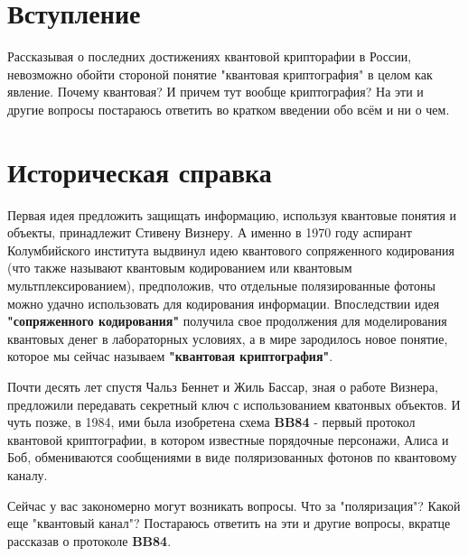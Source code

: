 





\section{Вступление}

Рассказывая о последних достижениях квантовой крипторафии в России, невозможно обойти стороной понятие "квантовая криптография" в целом как явление.
Почему квантовая? И причем тут вообще криптография? На эти и другие вопросы постараюсь ответить во кратком введении обо всём и ни о чем.

\section{Историческая справка}

Первая идея предложить защищать информацию, используя квантовые понятия и объекты, принадлежит Стивену Визнеру. 
А именно в 1970 году аспирант Колумбийского института выдвинул идею квантового сопряженного кодирования (что также называют квантовым кодированием или квантовым мультплексированием), 
предположив, что отдельные полязированные фотоны можно удачно использовать для кодирования информации. Впоследствии идея \textbf{"сопряженного кодирования"} получила свое продолжения для моделирования квантовых денег в лабораторных условиях, а в мире зародилось новое понятие, которое мы сейчас называем \textbf{"квантовая криптография"}. 

Почти десять лет спустя Чальз Беннет и Жиль Бассар, зная о работе Визнера, предложили передавать секретный ключ с использованием кватонвых объектов. И чуть позже, в 1984, ими была изобретена схема \textbf{BB84} - первый протокол квантовой криптографии, в котором известные порядочные персонажи, Алиса и Боб, обмениваются сообщениями в виде поляризованных фотонов по квантовому каналу. 

Сейчас у вас закономерно могут возникать вопросы. Что за "поляризация"? Какой еще "квантовый канал"?
Постараюсь ответить на эти и другие вопросы, вкратце рассказав о протоколе \textbf{BB84}. 


